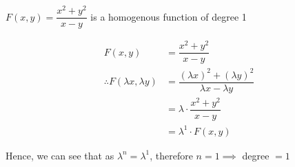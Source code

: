 \documentclass[14pt,fleqn]{extarticle}
\newcommand\lx{\lambda x}
\newcommand\ly{\lambda y}
\begin{document}
 
\begin{snippet}
    \correct
    
    $F(x,y) = \dfrac{x^2 + y^2}{x-y}$ is a homogenous function of degree 1
    
    \reason
    
    \begin{align}
    F(x,y) &= \dfrac{x^2 + y^2}{x-y} \\
    \therefore F \left(\lx,\ly \right) &= \dfrac{ \left(\lx \right)^2 + \left(\ly \right)^2}{\lx - \ly} \\
    &= \lambda\cdot\dfrac{x^2 + y^2}{x-y} \\
    &= \lambda^1\cdot F(x,y) 
\end{align}

Hence, we can see that as $\lambda^n = \lambda^1$, therefore $n=1\implies$ degree $=1$
    
\end{snippet} 
\end{document}
